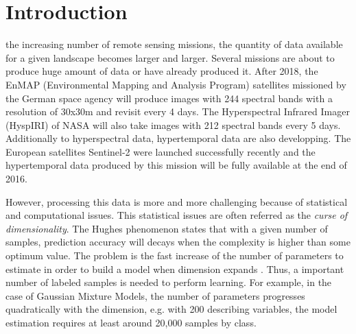 \documentclass[journal,peerreview,onecolumn]{IEEEtran}
\begin{document}

%
\IEEEpeerreviewmaketitle

\section{Introduction}
\label{sec:intro}

 the increasing number of remote sensing missions, the quantity of data available for a given landscape becomes larger and larger. Several missions are about to produce huge amount of data or have already produced it. After 2018, the EnMAP (Environmental Mapping and Analysis Program) satellites missioned by the German space agency will produce images with 244 spectral bands with a resolution of 30x30m and revisit every 4 days\cite{Müller09enmap}. The Hyperspectral Infrared Imager (HyspIRI) of NASA will also take images with 212 spectral bands every 5 days. Additionally to hyperspectral data, hypertemporal data are also developping. The European satellites Sentinel-2 were launched successfully recently and the hypertemporal data produced by this mission will be fully available at the end of 2016\cite{drusch2012sentinel}.

However, processing this data is more and more challenging because of statistical and computational issues. This statistical issues are often referred as the \emph{curse of dimensionality}. The Hughes phenomenon \cite{hughes1968mean} states that with a given number of samples, prediction accuracy will decays when the complexity is higher than some optimum value. The problem is the fast increase of the number of parameters to estimate in order to build a model when dimension expands \cite{bouveyron2014model}. Thus, a important number of labeled samples is needed to perform learning. For example, in the case of Gaussian Mixture Models, the number of parameters progresses quadratically with the dimension, e.g. with 200 describing variables, the model estimation requires at least around 20,000 samples by class.
\end{document}
